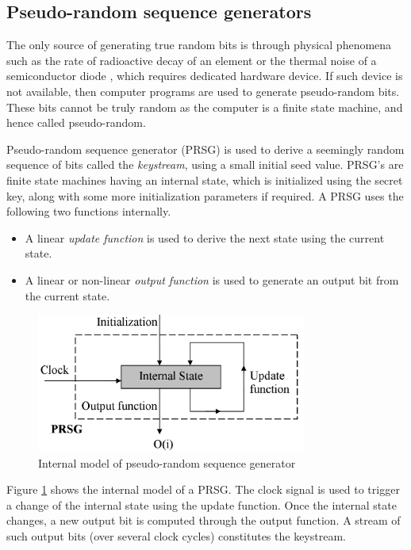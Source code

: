 \subsection{Pseudo-random sequence generators}
\label{sec:psrg}

The only source of generating true random bits is through physical phenomena such as the rate of radioactive decay of an element or the thermal noise of a semiconductor diode \cite{goldberg1996ran}, which requires dedicated hardware device. If such device is not available, then computer programs are used to generate pseudo-random bits. These bits cannot be truly random as the computer is a finite state machine, and hence called pseudo-random.

Pseudo-random sequence generator (PRSG) is used to derive a seemingly random sequence of bits called the \emph{keystream}, using a small initial seed value. PRSG's are finite state machines having an internal state, which is initialized using the secret key, along with some more initialization parameters if required. A PRSG uses the following two functions internally.
\begin{itemize}
\item A linear \emph{update function} is used to derive the next state using the current state.
\item A linear or non-linear \emph{output function} is used to generate an output bit from the current state. 
\end{itemize}

\begin{figure}[ht!]
	\centering
		\includegraphics[width=3.5in]{./figures/prsg.PNG}
	\caption{Internal model of pseudo-random sequence generator}	
	\label{fig:prsg}
\end{figure}

Figure \ref{fig:prsg} shows the internal model of a PRSG. The clock signal is used to trigger a change of the internal state using the update function. Once the internal state changes, a new output bit is computed through the output function. A stream of such output bits (over several clock cycles) constitutes the keystream.

